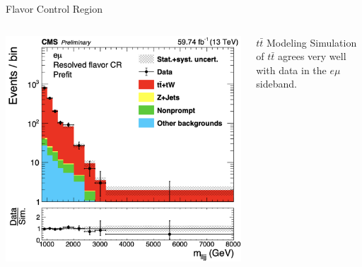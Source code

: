 \documentclass[aspectratio=169]{beamer}
\begin{document}
\begin{frame}{Flavor Control Region}
  \begin{columns}
    \begin{column}{0.50\textwidth}
      \centering
      \includegraphics[width=\textwidth]{../figures/plots/mass-fourobject-flavorcr.png}
    \end{column}
    \begin{column}{0.50\textwidth}
        \vspace*{-15mm}
        \centering
        \resizebox{\columnwidth}{!}{%
        }
      \vspace{1ex} 
      \begin{block}{$t\bar{t}$ Modeling}
        Simulation of $t\bar{t}$ agrees very well with data in the $e\mu$ sideband.
      \end{block}
    \end{column}
  \end{columns}
\end{frame}
\end{document}
